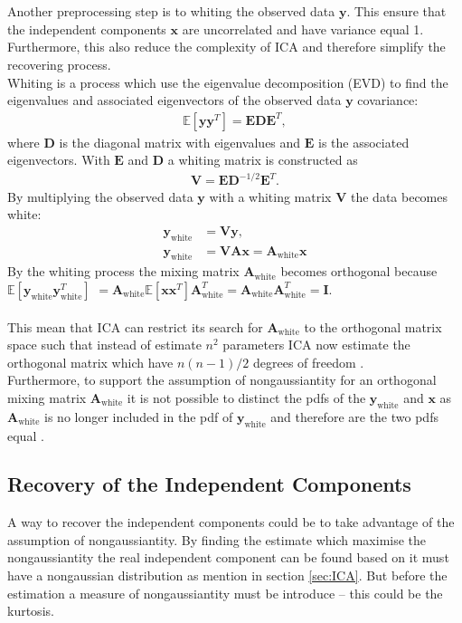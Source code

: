 \\ \\
Another preprocessing step is to whiting the observed data $\mathbf{y}$. This ensure that the independent components $\mathbf{x}$ are uncorrelated and have variance equal 1. Furthermore, this also reduce the complexity of ICA and therefore simplify the recovering process.
\\
Whiting is a process which use the eigenvalue decomposition (EVD) to find the eigenvalues and associated eigenvectors of the observed data $\mathbf{y}$ covariance:
\begin{align*}
\mathbb{E}[\mathbf{yy}^T] = \mathbf{EDE}^T,
\end{align*}
where $\mathbf{D}$ is the diagonal matrix with eigenvalues and $\mathbf{E}$ is the associated eigenvectors. With $\mathbf{E}$ and $\mathbf{D}$ a whiting matrix is constructed as
\begin{align*}
\mathbf{V} = \mathbf{ED}^{-1/2} \mathbf{E}^T.
\end{align*}
By multiplying the observed data $\mathbf{y}$ with a whiting matrix $\mathbf{V}$ the data becomes white:
\begin{align}
\mathbf{y}_{\text{white}} &= \mathbf{Vy}, \\
\mathbf{y}_{\text{white}} &= \mathbf{VAx} = \mathbf{A}_{\text{white}} \mathbf{x} \nonumber
\end{align}
By the whiting process the mixing matrix $\mathbf{A}_{\text{white}}$ becomes orthogonal because $\mathbb{E}[\mathbf{y}_{\text{white}} \mathbf{y}_{\text{white}}^T]$ $= \mathbf{A}_{\text{white}} \mathbb{E}[\mathbf{xx}^T] \mathbf{A}_{\text{white}}^T = \mathbf{A}_{\text{white}} \mathbf{A}_{\text{white}}^T = \mathbf{I}$. 
\\ \\
This mean that ICA can restrict its search for $\mathbf{A}_{\text{white}}$ to the orthogonal matrix space such that instead of estimate $n^2$ parameters ICA now estimate the orthogonal matrix which have $n(n-1)/2$ degrees of freedom \cite[p. 159]{ICA}.
\\
Furthermore, to support the assumption of nongaussiantity for an orthogonal mixing matrix $\mathbf{A}_{\text{white}}$ it is not possible to distinct the pdfs of the $\mathbf{y}_{\text{white}}$ and $\mathbf{x}$ as $\mathbf{A}_{\text{white}}$ is no longer included in the pdf of $\mathbf{y}_{\text{white}}$ and therefore are the two pdfs equal \cite[p. 161-163]{ICA}.

\subsection{Recovery of the Independent Components}\label{sec:est_ica}
A way to recover the independent components could be to take advantage of the assumption of nongaussiantity. By finding the estimate which maximise the nongaussiantity the real independent component can be found based on it must have a nongaussian distribution as mention in section \ref{sec:ICA}. But before the estimation a measure of nongaussiantity must be introduce -- this could be the kurtosis.

